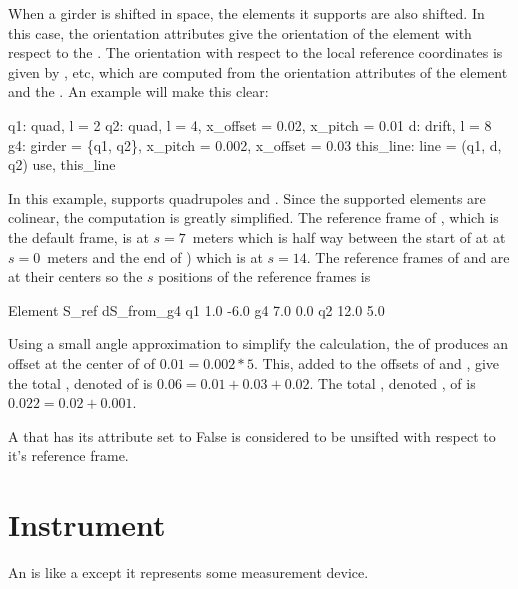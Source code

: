 When a girder is shifted in space, the elements
it supports are also shifted.  In this case, the orientation
attributes give the orientation of
the element with respect to the . The orientation with
respect to the local reference coordinates is given by
, etc, which are computed from the orientation attributes
of the element and the . An example will make this clear:
\begin{example}
  q1: quad, l = 2
  q2: quad, l = 4, x_offset = 0.02, x_pitch = 0.01
  d: drift, l = 8
  g4: girder = \{q1, q2\}, x_pitch = 0.002, x_offset = 0.03
  this_line: line = (q1, d, q2)
  use, this_line
\end{example}
In this example,  supports quadrupoles  and .
Since the supported elements are colinear, the computation is greatly
simplified. The reference frame of , which is the default
 frame, is at $s = 7$~meters which is half way between the
start of  at at $s = 0$~meters and the end of ) which is
at $s = 14$. The reference frames of  and  are at their
centers so the $s$ positions of the reference frames is
\begin{example}
  Element        S_ref   dS_from_g4
  q1             1.0     -6.0
  g4             7.0      0.0
  q2            12.0      5.0
\end{example}
Using a small angle approximation to simplify the calculation, the  of  produces
an offset at the center of  of $0.01 = 0.002 * 5$. This, added to the offsets of  and
, give the total , denoted  of  is $0.06 = 0.01 + 0.03 +
0.02$. The total , denoted , of  is $0.022 = 0.02 + 0.001$.

A  that has its  attribute set to False is considered to be unsifted with
respect to it's reference frame.

\section{Instrument}
\label{s:instrument}

An  is like a  except it represents some measurement device.

